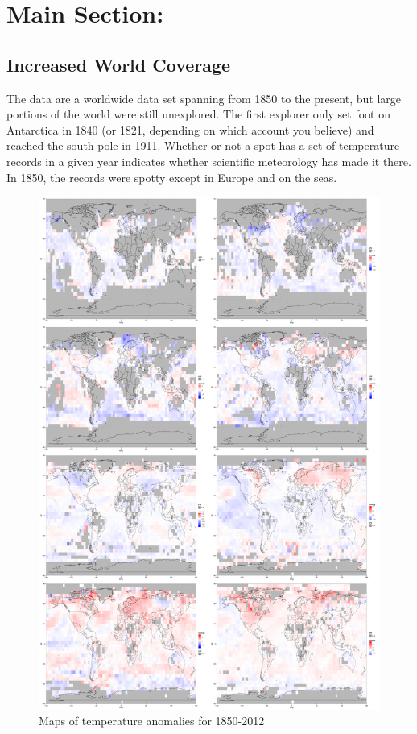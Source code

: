\documentclass{article}\usepackage{graphicx, color}
\newenvironment{knitrout}{}{} %
\begin{document}
\section{Main Section:}
\subsection*{Increased World Coverage}
The data are a worldwide data set spanning from 1850 to the present, but large portions of the world were still unexplored. The first explorer only set foot on Antarctica in 1840 (or 1821, depending on which account you believe) and reached the south pole in 1911. Whether or not a spot has a set of temperature records in a given year indicates whether scientific meteorology has made it there. In 1850, the records were spotty except in Europe and on the seas.
\begin{figure}
\begin{knitrout}
\color{fgcolor}\includegraphics[width=\textwidth,height=.8\textheight]{figure/chunk2} 
\end{knitrout}

\caption{\label{multiyearmap}Maps of temperature anomalies for 1850-2012}
\end{figure}
\end{document}
